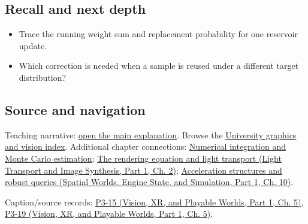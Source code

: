 \subsection{Recall and next depth}\label{appendix-68be451b78b1-recall-and-next-depth}

\hypertarget{appendix-68be451b78b1-recall-and-next-depth}{}

\begin{itemize}
\tightlist
\item
  Trace the running weight sum and replacement probability for one reservoir update.
\item
  Which correction is needed when a sample is reused under a different target distribution?
\end{itemize}

\subsection{Source and navigation}\label{appendix-68be451b78b1-source-and-navigation}

\hypertarget{appendix-68be451b78b1-source-and-navigation}{}

Teaching narrative: \hyperref[03-visual-computing-i-ch012-numerical-integration-and-monte-carlo-estimation]{open the main explanation}. Browse the \hyperref[appendix-a6d556a4ef50-university-graphics-vision-and-photography---independent-series]{University graphics and vision index}. Additional chapter connections: \hyperref[03-visual-computing-i-ch012-numerical-integration-and-monte-carlo-estimation]{Numerical integration and Monte Carlo estimation}; \href{../04-Light-Transport-and-Image-Synthesis-P01/main.pdf\#03-visual-computing-i-ch007-the-rendering-equation-and-light-transport}{The rendering equation and light transport (Light Transport and Image Synthesis, Part 1, Ch. 2)}; \href{../05-Spatial-Worlds-Engine-State-and-Simulation-P01/main.pdf\#04-visual-computing-ii-ch029-acceleration-structures-and-robust-queries-1}{Acceleration structures and robust queries (Spatial Worlds, Engine State, and Simulation, Part 1, Ch. 10)}.

Caption/source records: \href{../07-Vision-XR-and-Playable-Worlds-P01/main.pdf\#04-visual-computing-ii-ch036-p3-15---ray-tracing}{P3-15 (Vision, XR, and Playable Worlds, Part 1, Ch. 5)}, \href{../07-Vision-XR-and-Playable-Worlds-P01/main.pdf\#04-visual-computing-ii-ch036-p3-19---shadows-part-2}{P3-19 (Vision, XR, and Playable Worlds, Part 1, Ch. 5)}.
